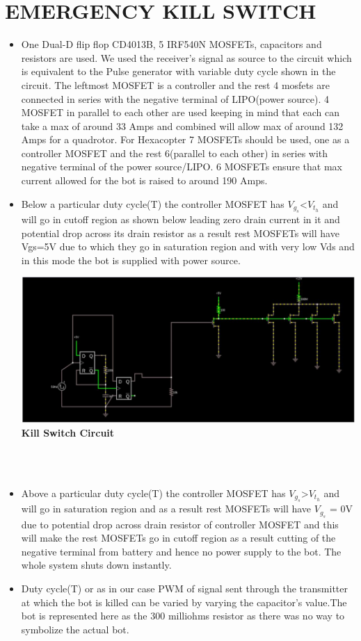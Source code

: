 \documentclass[12pt]{article}
\begin{document}
\section{EMERGENCY KILL SWITCH}
\begin{itemize}
\item One Dual-D flip flop CD4013B, 5 IRF540N MOSFETs, capacitors and resistors are used. We used the receiver’s signal as source to the circuit which is equivalent to the Pulse generator with variable duty cycle shown in the circuit. The leftmost MOSFET is a controller and the rest 4  mosfets  are connected in series with the negative terminal of LIPO(power source). 4 MOSFET in parallel to each other are used  keeping in mind that each can take a max of around 33 Amps and combined will allow max of around 132 Amps for a quadrotor. For Hexacopter 7 MOSFETs should be used, one as a controller MOSFET and the rest 6(parallel to each other) in series with negative terminal of the power source/LIPO. 6 MOSFETs ensure that max current allowed for the bot is raised to around 190 Amps.  
\item Below a particular duty cycle(T) the controller MOSFET has $V_g_s$<$V_t_h$ and will go in cutoff region as shown below leading zero drain current in it and potential drop across its drain resistor as a result rest MOSFETs will have Vgs=5V due to which they go in saturation region and with very low Vds and in this mode the bot is supplied with power source.\\
\begin{center}
\includegraphics[scale = 0.4]{kill} \\
\textbf{Kill Switch Circuit}\\ \\
\end{center}
\\
\item Above a particular duty cycle(T) the controller MOSFET has $V_g_s$>$V_t_h$ and will go in saturation region and as a result rest MOSFETs will have $V_g_s$ = 0V due to potential drop across drain resistor of controller MOSFET and this will make the rest MOSFETs go in cutoff region as a result cutting of the negative terminal from battery and hence no power supply to the bot. The whole system shuts down instantly.
\item Duty cycle(T) or as in our case PWM of signal  sent through the transmitter at which the bot is killed can be varied by varying the capacitor’s value.The bot is represented here as the 300 milliohms resistor as there was no way to symbolize the actual bot.
\end{itemize}
\end{document}
